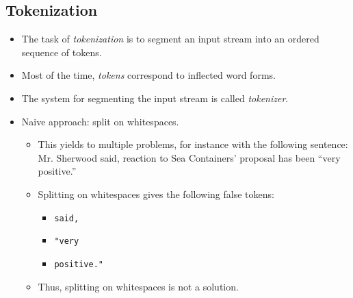 \documentclass[a4paper, 11pt, accentcolor = tud3b]{tudreport}
\begin{document}
            \subsection{Tokenization} %
                \begin{itemize}
                	\item The task of \textit{tokenization} is to segment an input stream into an ordered sequence of tokens.
                	\item Most of the time, \textit{tokens} correspond to inflected word forms.
                	\item The system for segmenting the input stream is called \textit{tokenizer}.
                	\item Naive approach: split on whitespaces.
                		\begin{itemize}
                			\item This yields to multiple problems, for instance with the following sentence: \\ Mr. Sherwood said, reaction to Sea Containers' proposal has been \enquote{very positive.}
                			\item Splitting on whitespaces gives the following false tokens:
                				\begin{itemize}
                					\item \texttt{said,}
                					\item \texttt{"very}
                					\item \texttt{positive."}
                				\end{itemize}
                			\item Thus, splitting on whitespaces is not a solution.
                		\end{itemize}
                \end{itemize}
\end{document}
